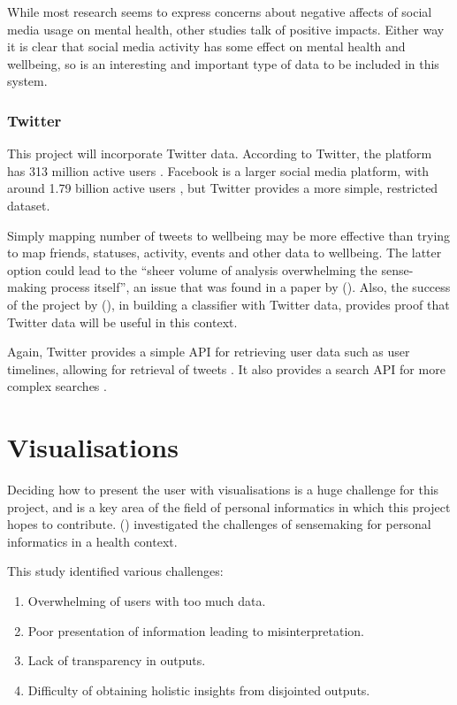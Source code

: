 \documentclass[11pt,openright,a4paper]{report}
\begin{document}
While most research seems to express concerns about negative affects of social media usage on mental health, other studies talk of positive impacts. Either way it is clear that social media activity has some effect on mental health and wellbeing, so is an interesting and important type of data to be included in this system.

\subsubsection{Twitter}
This project will incorporate Twitter data. According to Twitter, the platform has 313 million active users \parencite{twitterabout}. Facebook is a larger social media platform, with around 1.79 billion active users \parencite{facebookusers}, but Twitter provides a more simple, restricted dataset.

Simply mapping number of tweets to wellbeing may be more effective than trying to map friends, statuses, activity, events and other data to wellbeing. The latter option could lead to the \enquote{sheer volume of analysis overwhelming the sense-making process itself}, an issue that was found in a paper by \citeauthor{jones2016sensemaking} (\citeyear{jones2016sensemaking}). Also, the success of the project by \citeauthor{de2013predicting} (\citeyear{de2013predicting}), in building a classifier with Twitter data, provides proof that Twitter data will be useful in this context.

Again, Twitter provides a simple API for retrieving user data such as user timelines, allowing for retrieval of tweets \parencite{twitterrestapi}. It also provides a search API for more complex searches \parencite{twittersearchapi}.

\section{Visualisations} \label{visualisations}
Deciding how to present the user with visualisations is a huge challenge for this project, and is a key area of the field of personal informatics in which this project hopes to contribute. \citeauthor{jones2016sensemaking} (\citeyear{jones2016sensemaking}) investigated the challenges of sensemaking for personal informatics in a health context.

This study identified various challenges:
\begin{enumerate}
\item Overwhelming of users with too much data.
\item Poor presentation of information leading to misinterpretation.
\item Lack of transparency in outputs.
\item Difficulty of obtaining holistic insights from disjointed outputs.
\end{enumerate}
\end{document}
